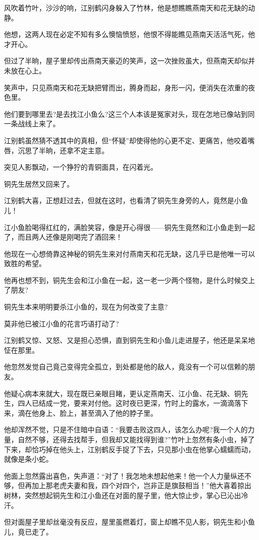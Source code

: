 \documentclass[12pt,oneside]{book}
\begin{document}
风吹着竹叶，沙沙的响，江别鹤闪身躲入了竹林，他是想瞧瞧燕南天和花无缺的动静。

他想，这两人现在必定不知有多么懊恼愤怒，他恨不得能瞧见燕南天活活气死，他才开心。

但过了半晌，屋子里却传出燕南天豪迈的笑声，这一次挫败虽大，但燕南天却似并未放在心上。

笑声中，只见燕南天和花无缺把臂而出，腾身而起，身形一闪，便消失在浓重的夜色里。

他们要到哪里去?是去找江小鱼么?这三个人本该是冤家对头，现在怎地已像站到同一条战线上来了。

江别鹤虽然猜不透其中的真相，但``怀疑''却使得他的心更不定、更痛苦，他咬着嘴唇，沉思了半晌，还拿不定主意。

突见人影飘动，一个狰狞的青铜面具，在闪着光。

铜先生居然又回来了。

江别鹤大喜，正想赶过去，但就在这时，也看清了铜先生身旁的人，竟然是小鱼儿！

江小鱼脸喝得红红的，满脸笑容，像是开心得很------铜先生竟然和江小鱼走到一起了，而且两人还像是刚喝完了酒回来！

他现在一心想倚靠这神秘的铜先生来对付燕南天和花无缺，这几乎已是他唯一可以致胜的希望。

他再也想不到，铜先生会和江小鱼在一起，这一老一少两个怪物，是什么时候交上了朋友?

铜先生本来明明要杀江小鱼的，现在为何改变了主意?

莫非他已被江小鱼的花言巧语打动了?

江别鹤又惊、又怒、又是担心恐惧，直到铜先生和小鱼儿走进屋子，他还是呆呆地怔在那里。

他忽然发觉自己竟己变得完全孤立，到处都是他的敌人，竟没有一个可以信赖的朋友。

他疑心病本来就大，现在既已亲眼目睹，更认定燕南天、江小鱼、花无缺、铜先生，四人已结成一党，要来对付他。这时夜已更深，竹时上的露水，一滴滴落下来，滴在他身上、脸上，甚至滴入了他的脖子里。

他却浑然不觉，只是不住暗中自语：``我要击败这四人，该怎么办呢?我一个人的力量，自然不够，还得去找帮手，但我却又能找得到谁?''竹叶上忽然有条小虫，掉了下来，却恰巧掉在他头上，江别鹤反手捉了下去，只见那小虫在他掌心蠕蠕而动，就像是条小蛇。

他面上忽然露出喜色，失声道：``对了！我怎地未想起他来！他一个人力量纵还不够，但再加上那老虎夫妻和我，四个对四个，岂非正是旗鼓相当！''他大喜着掠出树林，突然想起铜先生和江小鱼还在对面的屋子里，他大惊止步，掌心已沁出冷汗。

但对面屋子里却丝毫没有反应，屋里虽燃着灯，窗上却瞧不见人影，铜先生和小鱼儿，竟已走了。
\end{document}
